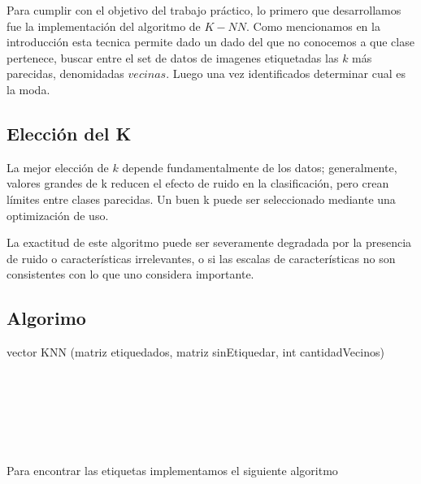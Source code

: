Para cumplir con el objetivo del trabajo práctico, lo primero que desarrollamos fue la implementación del algoritmo de $K-NN$. Como mencionamos en la introducción esta tecnica permite dado un dado del que no conocemos a que clase pertenece, buscar entre el set de datos de imagenes etiquetadas las $k$ más parecidas, denomidadas $vecinas$. Luego una vez identificados determinar cual es la moda.

\subsection {Elección del K}

La mejor elección de $k$ depende fundamentalmente de los datos; generalmente, valores grandes de k reducen el efecto de ruido en la clasificación, pero crean límites entre clases parecidas. Un buen k puede ser seleccionado mediante una optimización de uso.

La exactitud de este algoritmo puede ser severamente degradada por la presencia de ruido o características irrelevantes, o si las escalas de características no son consistentes con lo que uno considera importante.


\subsection {Algorimo}


\begin{algorithm}
    \begin{algorithmic}[1]\parskip=2mm
        \caption{vector KNN (matriz etiquedados, matriz sinEtiquedar, int cantidadVecinos)}
        \\
        \\
        \\
        \\
        \\
    \end{algorithmic}
\end{algorithm}


Para encontrar las etiquetas implementamos el siguiente algoritmo


